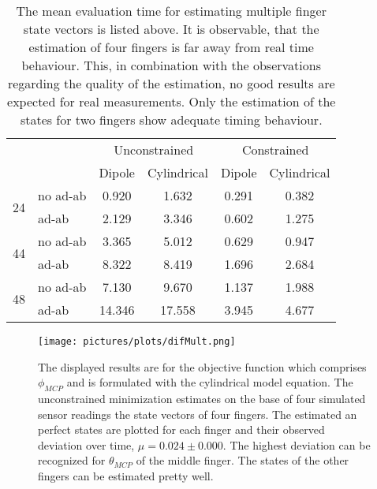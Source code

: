 \begin{table}[h]
\centering
\begin{tabular}{l l c c c c}
\toprule
 & &         			\multicolumn{2}{c}{Unconstrained}		 & 	\multicolumn{2}{c}{Constrained}\\ \cmidrule(lr){3-4} \cmidrule(lr){5-6}
 & & 								Dipole & Cylindrical & Dipole & Cylindrical \\ \midrule[2pt]
\multirow{2}{*}{24} & no ad-ab    & 0.920 & 1.632 & 0.291 & 0.382 \\ 
					& ad-ab		 & 2.129  & 3.346 & 0.602 & 1.275 \\ \midrule
\multirow{2}{*}{44} & no ad-ab   & 3.365 & 5.012 & 0.629 & 0.947 \\ 
					& ad-ab		  & 8.322  & 8.419 & 1.696 & 2.684 \\ \midrule
\multirow{2}{*}{48} & no ad-ab    & 7.130 &  9.670 & 1.137 & 1.988 \\ 
					& ad-ab		 & 14.346 & 17.558 & 3.945 & 4.677 \\										
\bottomrule
\end{tabular}
\caption[Time for one estimation step of multiple finger state vectors]
{The mean evaluation time for estimating multiple finger state vectors is listed above. It is observable, that the estimation of four fingers is far away from real time behaviour. This, in combination with the observations regarding the quality of the estimation, no good results are expected for real measurements. Only the estimation of the states for two fingers show adequate timing behaviour.}
\label{tab:timeMultFing}
\end{table}

\begin{figure}
\centering
\texttt{[image: pictures/plots/difMult.png]}
\caption[Estimated states for a system configuration of four sensors and four magnets]
{The displayed results are for the objective function which comprises $ \phi_{MCP} $ and is formulated with the cylindrical model equation. The unconstrained minimization estimates on the base of four simulated sensor readings the state vectors of four fingers.  The estimated an perfect states are plotted for each finger and their observed deviation over time, $ \mu = 0.024 \pm 0.000 $. The highest deviation can be recognized for $ \theta_{MCP} $ of the middle finger. The states of the other fingers can be estimated pretty well.}
\label{fig:difMult}
\end{figure}

